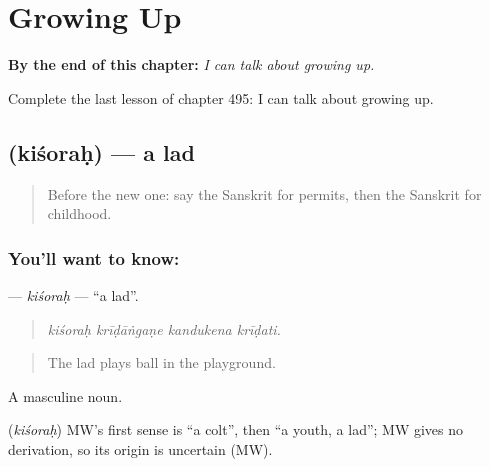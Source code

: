 
\chapter{Growing Up}
\label{ch:sa-growing-up}

\begin{chapteropening}
\textbf{By the end of this chapter:} \emph{I can talk about growing up.}

Complete the last lesson of chapter 495: I can talk about growing up.
\end{chapteropening}

\section[\texorpdfstring{\sk{किशोरः} (kiśoraḥ)}{किशोरः (kiśoraḥ)}]{ (kiśoraḥ) — a lad}

\label{lesson:SA-C495-kisorah}



\begin{quote}
Before the new one: say the Sanskrit for permits, then the Sanskrit for childhood.
\end{quote}

\subsection*{You'll want to know: }
\textbf{} — \emph{kiśoraḥ} — \textquotedblleft{}a lad\textquotedblright{}.

\begin{quote}
   
\end{quote}

\begin{quote}
\emph{kiśoraḥ krīḍāṅgaṇe kandukena krīḍati.}
\end{quote}

\begin{quote}
The lad plays ball in the playground.
\end{quote}

A masculine noun.

\begin{cousinweb}
\textbf{} (\emph{kiśoraḥ}) MW's first sense is \textquotedblleft{}a colt\textquotedblright{}, then \textquotedblleft{}a youth, a lad\textquotedblright{}; MW gives no derivation, so its origin is uncertain (MW).
\end{cousinweb}

